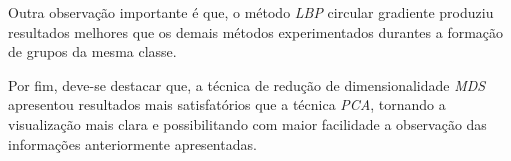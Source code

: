 \documentclass[conference]{IEEEtran}
\begin{document}
Outra observação importante é que, o método \textit{LBP} circular gradiente produziu resultados melhores que os demais métodos experimentados durantes a formação de grupos da mesma classe.

Por fim, deve-se destacar que, a técnica de redução de dimensionalidade \textit{MDS} apresentou resultados mais satisfatórios que a técnica \textit{PCA}, tornando a visualização mais clara e possibilitando com maior facilidade a observação das informações anteriormente apresentadas.  




%
%
%








\end{document}
